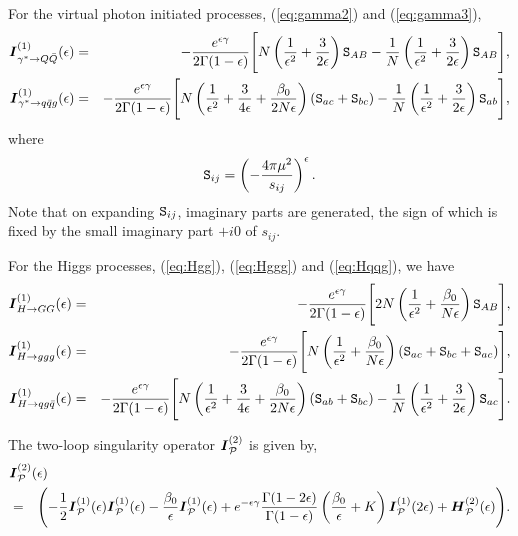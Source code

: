 \documentclass[paper,notoc,nohyper]{JHEP3}
\def\P{{\cal P}}
\def\bom#1{{\mbox{\boldmath $#1$}}}
\begin{document}
For the virtual photon initiated processes,  (\ref{eq:gamma2}) and 
(\ref{eq:gamma3}),
\begin{eqnarray}
\bom{I}_{\gamma^* \to Q\bar Q}^{(1)}(\epsilon)
&=&
- \frac{e^{\epsilon\gamma}}{2\Gamma(1-\epsilon)} \Biggl[
N \left(\frac{1}{\epsilon^2}+\frac{3}{2\epsilon}\right) 
{\tt S}_{AB}-\frac{1}{N}
\left(\frac{1}{\epsilon^2}+\frac{3}{2\epsilon}\right)
{\tt S}_{AB}\Biggr ], \\
\bom{I}_{\gamma^* \to q\bar q g}^{(1)}(\epsilon)
&=&
- \frac{e^{\epsilon\gamma}}{2\Gamma(1-\epsilon)} \Biggl[
N \left(\frac{1}{\epsilon^2}+\frac{3}{4\epsilon}+\frac{\beta_0}{2N\epsilon}\right) 
\left({\tt S}_{ac}+{\tt S}_{bc}\right)-\frac{1}{N}
\left(\frac{1}{\epsilon^2}+\frac{3}{2\epsilon}\right)
{\tt S}_{ab}\Biggr ],
\end{eqnarray}
where  
\begin{equation}
{\tt S}_{ij} = \left(-\frac{4\pi\mu^2}{s_{ij}}\right)^{\epsilon}.
\end{equation}
Note that on expanding ${\tt S}_{ij}$,
imaginary parts are generated, the sign of which is fixed by the small imaginary
part $+i0$ of $s_{ij}$.

For the Higgs processes,  (\ref{eq:Hgg}), (\ref{eq:Hggg}) and 
(\ref{eq:Hqqg}), we have
\begin{eqnarray}
\bom{I}_{H \to GG}^{(1)}(\epsilon)
&=&
- \frac{e^{\epsilon\gamma}}{2\Gamma(1-\epsilon)} \Biggl[
2N \left(\frac{1}{\epsilon^2}+\frac{\beta_0}{N\epsilon}\right) 
{\tt S}_{AB}\Biggr ], \\
\bom{I}_{H \to ggg}^{(1)}(\epsilon)
&=&
- \frac{e^{\epsilon\gamma}}{2\Gamma(1-\epsilon)} \Biggl[
N \left(\frac{1}{\epsilon^2}+\frac{\beta_0}{N\epsilon}\right) 
\left({\tt S}_{ac}+{\tt S}_{bc}+{\tt S}_{ac}\right)\Biggr ],\\
\bom{I}_{H \to qg\bar q}^{(1)}(\epsilon)
&=&
- \frac{e^{\epsilon\gamma}}{2\Gamma(1-\epsilon)} \Biggl[
N \left(\frac{1}{\epsilon^2}+\frac{3}{4\epsilon}+\frac{\beta_0}{2N\epsilon}\right) \left({\tt S}_{ab}+{\tt S}_{bc}\right) 
-\frac{1}{N}  \left(\frac{1}{\epsilon^2}+\frac{3}{2\epsilon}\right) {\tt S}_{ac} \Biggr ].
\end{eqnarray}

The two-loop singularity operator ${\bom I}_{\P}^{(2)}$ is given by,
\begin{eqnarray}
\lefteqn{{\bom I}_{\P}^{(2)}(\epsilon)}\nonumber \\
&=&
\Biggl (-\frac{1}{2}  {\bom I}_{\P}^{(1)}(\epsilon) {\bom I}_{\P}^{(1)}(\epsilon)
-\frac{\beta_0}{\epsilon} {\bom I}_{\P}^{(1)}(\epsilon) 
+e^{-\epsilon \gamma } \frac{ \Gamma(1-2\epsilon)}{\Gamma(1-\epsilon)} 
\left(\frac{\beta_0}{\epsilon} + K\right)
{\bom I}_{\P}^{(1)}(2\epsilon) + {\bom H}_{\P}^{(2)}(\epsilon) 
\Biggr ).
\end{eqnarray}
\end{document}
